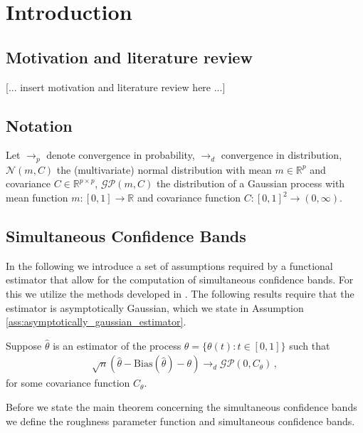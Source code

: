 \section{Introduction}


\subsection{Motivation and literature review}

\begin{center}
[... insert motivation and literature review here ...]
\end{center}

\subsection{Notation}

Let $\to_p$ denote convergence in probability, $\to_d$ convergence in distribution,
$\mathcal{N}(m, C)$ the (multivariate) normal distribution with mean $m \in
\mathbb{R}^p$ and covariance $C \in \mathbb{R}^{p \times p}$, $\mathcal{GP}(m, C)$ the
distribution of a Gaussian process with mean function $m:[0, 1] \to \mathbb{R}$ and
covariance function $C:[0, 1]^2 \to (0, \infty)$.


\subsection{Simultaneous Confidence Bands}

In the following we introduce a set of assumptions required by a functional estimator
that allow for the computation of simultaneous confidence bands. For this we utilize the
methods developed in \cite{liebl2021}. The following results require that the estimator
is asymptotically Gaussian, which we state in Assumption
\ref{ass:asymptotically_gaussian_estimator}.

\begin{assumption}
    \label{ass:asymptotically_gaussian_estimator}
    Suppose $\hat{\theta}$ is an estimator of the process $\theta = \{\theta(t) : t \in
    [0, 1]\}$ such that
    \begin{align*}
        \sqrt{n}(\hat{\theta} - \text{Bias}(\hat{\theta}) - \theta) \to_d
        \mathcal{GP}(0, C_\theta) \,,
    \end{align*}
    for some covariance function $C_\theta$.
\end{assumption}

Before we state the main theorem concerning the simultaneous confidence bands we define
the roughness parameter function and simultaneous confidence bands.

